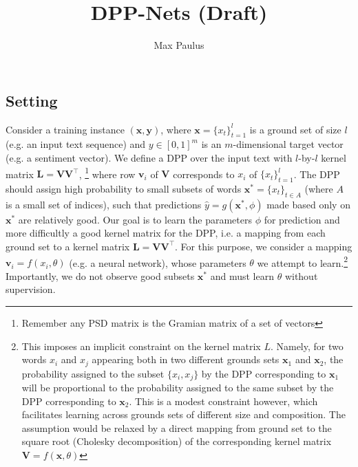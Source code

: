 \documentclass[12pt, oneside]{article}   	%
\title{DPP-Nets (Draft)}
\author{Max Paulus}
\begin{document}
\maketitle
\subsection*{Setting}
Consider a training instance $(\textbf{x},\textbf{y})$, where $\textbf{x} = \{x_t\}^l_{t=1}$ is a ground set of size $l$ (e.g. an input text sequence) and $y \in [0,1]^m$ is an $m$-dimensional target vector (e.g. a sentiment vector). We define a DPP over the input text with $l$-by-$l$ kernel matrix $\textbf{L} = \textbf{V}\textbf{V}^\top$, \footnote{Remember any PSD matrix is the Gramian matrix of a set of vectors} where row $\textbf{v}_i$ of $\textbf{V}$ corresponds to $x_i$ of $\{x_t\}^l_{t=1}$. The DPP should assign high probability to small subsets of words $\textbf{x}^*=\{x_t\}_{t \in A}$ (where $A$ is a small set of indices), such that predictions $\hat{y} = g(\textbf{x}^*, \phi)$ made based only on $\textbf{x}^*$ are relatively good. 
Our goal is to learn the parameters $\phi$ for prediction and more difficultly a good kernel matrix for the DPP, i.e. a mapping from each ground set to a kernel matrix $\textbf{L} = \textbf{V}\textbf{V}^\top$. For this purpose, we consider a mapping $\textbf{v}_i = f(x_i, \theta)$ (e.g. a neural network), whose parameters $\theta$ we attempt to learn.\footnote{This imposes an implicit constraint on the kernel matrix $L$. Namely, for two words $x_i$ and $x_j$ appearing both in two different grounds sets $\textbf{x}_1$ and $\textbf{x}_2$, the probability assigned to the subset $\{x_i,x_j\}$ by the DPP corresponding to  $\textbf{x}_1$ will be proportional to the probability assigned to the same subset by the DPP corresponding to $\textbf{x}_2$. This is a modest constraint however, which facilitates learning across grounds sets of different size and composition. The assumption would be relaxed by a direct mapping from ground set to the square root (Cholesky decomposition) of the corresponding kernel matrix $\textbf{V} = f(\textbf{x}, \theta)$} Importantly, we do not observe good subsets $\textbf{x}^*$ and must learn $\theta$ without supervision. 
\end{document}
